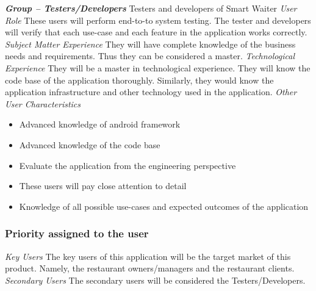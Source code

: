 \documentclass[12pt, titlepage]{article}
\begin{document}
\textbf{\textit{Group – Testers/Developers}}\newline
Testers and developers of Smart Waiter \newline
\newline
\textit{User Role}\newline
These users will perform end-to-to system testing. The tester and developers will verify that each use-case and each feature in the application works correctly. \newline\newline
\textit{Subject Matter Experience}\newline
They will have complete knowledge of the business needs and requirements. Thus they can be considered a master. \newline\newline
\textit{Technological Experience}\newline
They will be a master in technological experience. They will know the code base of the application thoroughly. Similarly, they would know the application infrastructure and other technology used in the application. \newline\newline
\textit{Other User Characteristics}
\begin{itemize}
  \item Advanced knowledge of android framework
  \item Advanced knowledge of the code base
  \item 	Evaluate the application from the engineering perspective
  \item 	These users will pay close attention to detail
  \item 	Knowledge of all possible use-cases and expected outcomes of the application
\end{itemize}

\subsubsection{Priority assigned to the user}
\textit{Key Users }\newline
The key users of this application will be the target market of this product. Namely, the restaurant owners/managers and the restaurant clients.\newline
\newline
\textit{Secondary Users}\newline
The secondary users will be considered the Testers/Developers.
\newline
\end{document}
